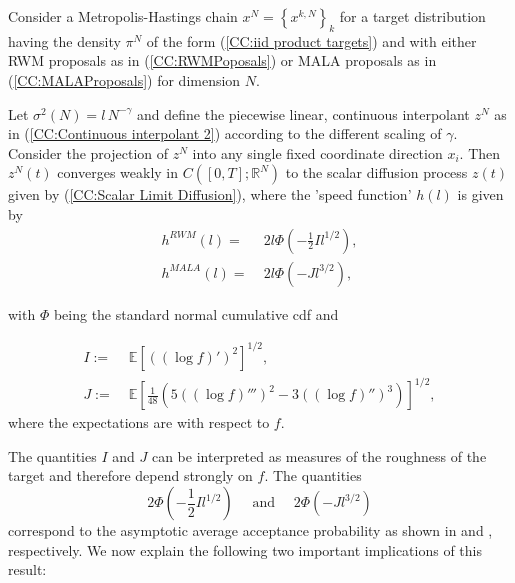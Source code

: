 \begin{thm}
 \label{CC: Product Diffusion Limit Result}
 
 Consider a Metropolis-Hastings chain $ x^{N} = \left\{  x^{k,N} \right\}_{k} $ for a target distribution having the density $ \pi^{N} $ of the form (\ref{CC:iid product targets}) and with either RWM proposals as in (\ref{CC:RWMPoposals}) or MALA proposals as in (\ref{CC:MALAProposals}) for dimension $N$.
 
 Let $ \sigma^2 (N) = l\,N^{-\gamma}$ and define the piecewise linear, continuous interpolant $z^{N}$  as in (\ref{CC:Continuous interpolant 2}) according to the different scaling of $\gamma$. Consider the projection of $z^{N}$ into any single fixed coordinate direction $x_i$. Then $z^{N}(t)$ converges weakly in $ C \left( [0,T]; \mathbb{R}^{N}\right) $ to the scalar diffusion process $z(t)$ given by (\ref{CC:Scalar Limit Diffusion}), where the 'speed function' $h(l)$ is given by
 \begin{align}
  h^{RWM}(l) = & \; 2l \Phi \left( - \frac{1}{2} I l^{1/2} \right), \\
  h^{MALA}(l) = & \; 2l \Phi \left( - J l^{3/2} \right),
 \end{align}

 with $\Phi$ being the standard normal cumulative cdf and
 
 \begin{align}
  I := & \; \mathbb{E} \left[ \left( \left( \log f \right)' \right)^2  \right]^{1/2}, \\
  J := & \; \mathbb{E} \left[ \frac{1}{48} \left( 5 \left( \left( \log f \right)''' \right)^2 - 3 \left( \left( \log f \right)'' \right)^3 \right) \right]^{1/2},
 \end{align}
 where the expectations are with respect to $f$.
 
\end{thm}

The quantities $I$ and $J$ can be interpreted as measures of the roughness of the target and therefore depend strongly on $f$. The quantities 
\begin{equation}
 2 \Phi \left( - \frac{1}{2} I l^{1/2} \right) \quad \text{ and } \quad 2 \Phi \left( - J l^{3/2} \right)
\end{equation}
correspond to the asymptotic average acceptance probability as shown in \autocite{Roberts1997} and \autocite{Roberts1998}, respectively.
We now explain the following two important implications of this result:

